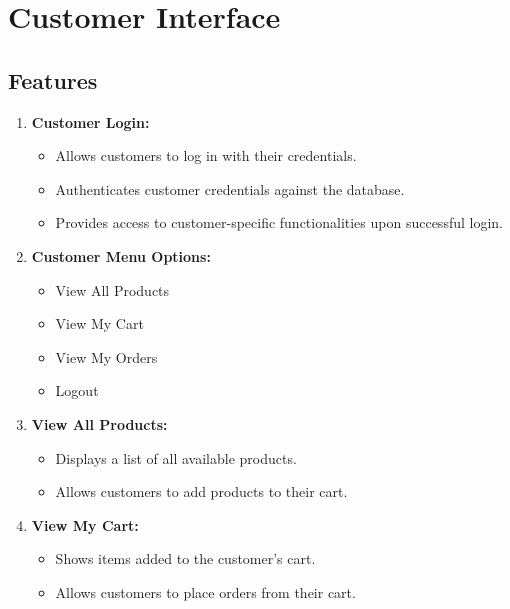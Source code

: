 \documentclass[12pt]{article}
\begin{document}
\section{Customer Interface}

\subsection{Features}

\begin{enumerate}
    \item \textbf{Customer Login:}
        \begin{itemize}
            \item Allows customers to log in with their credentials.
            \item Authenticates customer credentials against the database.
            \item Provides access to customer-specific functionalities upon successful login.
        \end{itemize}
    
    \item \textbf{Customer Menu Options:}
        \begin{itemize}
            \item View All Products
            \item View My Cart
            \item View My Orders
            \item Logout
        \end{itemize}
    
    \item \textbf{View All Products:}
        \begin{itemize}
            \item Displays a list of all available products.
            \item Allows customers to add products to their cart.
        \end{itemize}
    
    \item \textbf{View My Cart:}
        \begin{itemize}
            \item Shows items added to the customer's cart.
            \item Allows customers to place orders from their cart.
        \end{itemize}
\end{enumerate}
\end{document}
